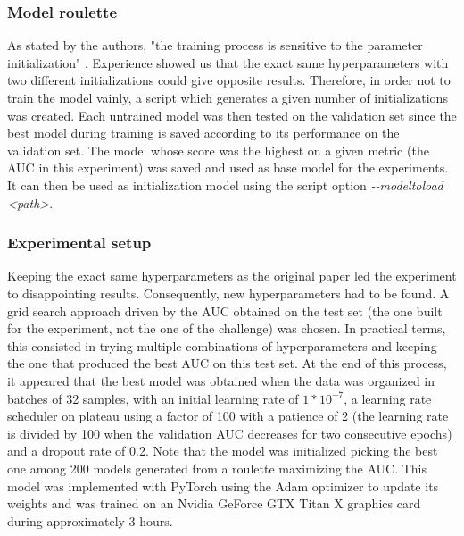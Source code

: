 \subsubsection{Model roulette}
\setlength{\marginparwidth}{3cm}\leavevmode {}As stated by the authors, "the training process is sensitive to the parameter initialization" \cite{07}. Experience showed us that the exact same hyperparameters with two different initializations could give opposite results. Therefore, in order not to train the model vainly, a script which generates a given number of initializations was created. Each untrained model was then tested on the validation set since the best model during training is saved according to its performance on the validation set. The model whose score was the highest on a given metric (the AUC in this experiment) was saved and used as base model for the experiments. It can then be used as initialization model using the script option \textit{-{}-modeltoload <path>}.



\subsubsection{Experimental setup}
\label{sec:paper_reproduction_experimental_setup}
\setlength{\marginparwidth}{3cm}\leavevmode {}Keeping the exact same hyperparameters as the original paper led the experiment to disappointing results. Consequently, new hyperparameters had to be found. A grid search approach driven by the AUC obtained on the test set (the one built for the experiment, not the one of the challenge) was chosen. In practical terms, this consisted in trying multiple combinations of hyperparameters and keeping the one that produced the best AUC on this test set. At the end of this process, it appeared that the best model was obtained when the data was organized in batches of 32 samples, with an initial learning rate of $1*10^{-7}$, a learning rate scheduler on plateau using a factor of 100 with a patience of 2 (the learning rate is divided by 100 when the validation AUC decreases for two consecutive epochs) and a dropout rate of 0.2. Note that the model was initialized picking the best one among 200 models generated from a roulette maximizing the AUC. This model was implemented with PyTorch using the Adam optimizer to update its weights and was trained on an Nvidia GeForce GTX Titan X graphics card during approximately 3 hours.\\

